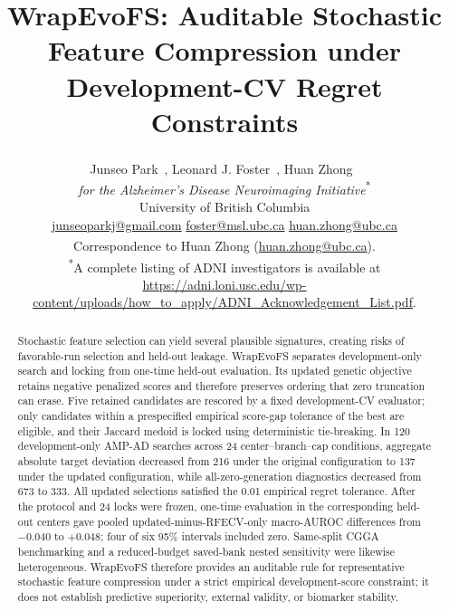 \documentclass[10pt,letterpaper]{article}
\title{\LARGE\bfseries WrapEvoFS: Auditable Stochastic Feature Compression under Development-CV Regret Constraints}
\author{%
  \normalsize Junseo Park~\orcidlink{0009-0002-4385-6987}, Leonard J. Foster~\orcidlink{0000-0001-8551-4817}, Huan Zhong~\orcidlink{0000-0002-7294-2254}\textsuperscript{\dagger}\\[0.2em]
  \small\textit{for the Alzheimer's Disease Neuroimaging Initiative}\textsuperscript{*}\\[0.25em]
  \small University of British Columbia\\[0.2em]
  \footnotesize
  \href{mailto:junseoparkj@gmail.com}{junseoparkj@gmail.com}\quad
  \href{mailto:foster@msl.ubc.ca}{foster@msl.ubc.ca}\quad
  \href{mailto:huan.zhong@ubc.ca}{huan.zhong@ubc.ca}\\[0.2em]
  \footnotesize \textsuperscript{\dagger}Correspondence to Huan Zhong (\href{mailto:huan.zhong@ubc.ca}{huan.zhong@ubc.ca}).\\[0.15em]
  \scriptsize \textsuperscript{*}A complete listing of ADNI investigators is available at \url{https://adni.loni.usc.edu/wp-content/uploads/how_to_apply/ADNI_Acknowledgement_List.pdf}.%
}
\date{}
\begin{document}
\maketitle
\modulolinenumbers[1]
\linenumbers

\begin{abstract}
Stochastic feature selection can yield several plausible signatures, creating risks of favorable-run selection and held-out leakage. WrapEvoFS separates development-only search and locking from one-time held-out evaluation. Its updated genetic objective retains negative penalized scores and therefore preserves ordering that zero truncation can erase. Five retained candidates are rescored by a fixed development-CV evaluator; only candidates within a prespecified empirical score-gap tolerance of the best are eligible, and their Jaccard medoid is locked using deterministic tie-breaking. In 120 development-only AMP-AD searches across 24 center--branch--cap conditions, aggregate absolute target deviation decreased from 216 under the original configuration to 137 under the updated configuration, while all-zero-generation diagnostics decreased from 673 to 333. All updated selections satisfied the 0.01 empirical regret tolerance. After the protocol and 24 locks were frozen, one-time evaluation in the corresponding held-out centers gave pooled updated-minus-RFECV-only macro-AUROC differences from $-0.040$ to $+0.048$; four of six 95\% intervals included zero. Same-split CGGA benchmarking and a reduced-budget saved-bank nested sensitivity were likewise heterogeneous. WrapEvoFS therefore provides an auditable rule for representative stochastic feature compression under a strict empirical development-score constraint; it does not establish predictive superiority, external validity, or biomarker stability.
\end{abstract}



\FloatBarrier


\end{document}
